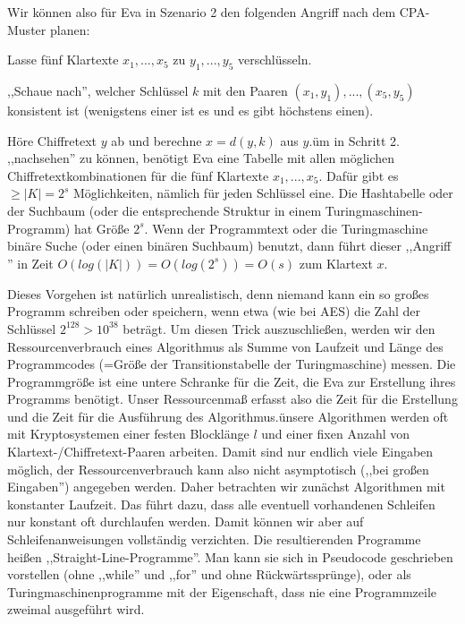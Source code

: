 \documentclass[a4paper]{article}
\begin{document}
\begin{multicols}{3}
    Wir können also für Eva in Szenario 2 den folgenden Angriff nach dem CPA-Muster planen:
    \begin{enumerate*}
        \item Lasse fünf Klartexte $x_1,...,x_5$ zu $y_1,...,y_5$ verschlüsseln.
        \item  ,,Schaue nach'', welcher Schlüssel $k$ mit den Paaren $(x_1,y_1),...,(x_5,y_5)$ konsistent ist (wenigstens einer ist es und es gibt höchstens einen).
        \item Höre Chiffretext $y$ ab und berechne $x=d(y,k)$ aus $y$.üm in Schritt 2. ,,nachsehen'' zu können, benötigt Eva eine Tabelle mit allen möglichen Chiffretextkombinationen für die fünf Klartexte $x_1,...,x_5$. Dafür gibt es $\geq |K|= 2^s$ Möglichkeiten, nämlich für jeden Schlüssel eine. Die Hashtabelle oder der Suchbaum (oder die entsprechende Struktur in einem Turingmaschinen-Programm) hat Größe $2^s$. Wenn der Programmtext oder die Turingmaschine binäre Suche (oder einen binären Suchbaum) benutzt, dann führt dieser ,,Angriff '' in Zeit $O(log(|K|)) =O(log(2^s)) =O(s)$ zum Klartext $x$.
    \end{enumerate*}

    Dieses Vorgehen ist natürlich unrealistisch, denn niemand kann ein so großes Programm schreiben oder speichern, wenn etwa (wie bei AES) die Zahl der Schlüssel $2^{128}>10^{38}$ beträgt. Um diesen Trick auszuschließen, werden wir den Ressourcenverbrauch eines Algorithmus als Summe von Laufzeit und Länge des Programmcodes (=Größe der Transitionstabelle der Turingmaschine) messen. Die Programmgröße ist eine untere Schranke für die Zeit, die Eva zur Erstellung ihres Programms benötigt. Unser Ressourcenmaß erfasst also die Zeit für die Erstellung und die Zeit für die Ausführung des Algorithmus.ünsere Algorithmen werden oft mit Kryptosystemen einer festen Blocklänge $l$ und einer fixen Anzahl von Klartext-/Chiffretext-Paaren arbeiten. Damit sind nur endlich viele Eingaben möglich, der Ressourcenverbrauch kann also nicht asymptotisch (,,bei großen Eingaben'') angegeben werden. Daher betrachten wir zunächst Algorithmen mit konstanter Laufzeit. Das führt dazu, dass alle eventuell vorhandenen Schleifen nur konstant oft durchlaufen werden. Damit können wir aber auf Schleifenanweisungen vollständig verzichten. Die resultierenden Programme heißen ,,Straight-Line-Programme''. Man kann sie sich in Pseudocode geschrieben vorstellen (ohne ,,while'' und ,,for'' und ohne Rückwärtssprünge), oder als Turingmaschinenprogramme mit der Eigenschaft, dass nie eine Programmzeile zweimal ausgeführt wird.


\end{multicols}
\end{document}
